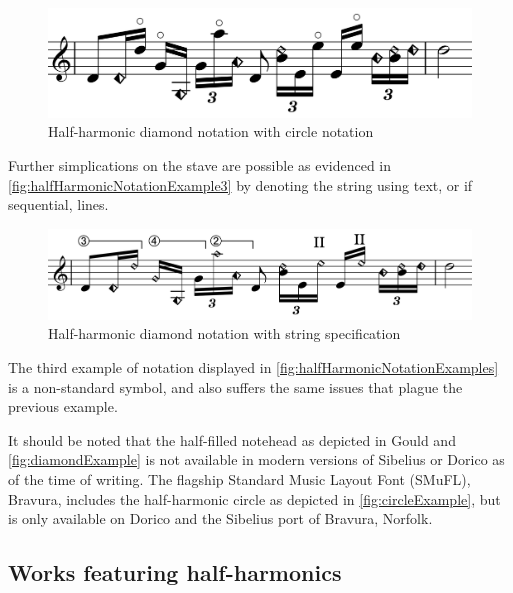   \begin{figure}
    \includegraphics[width=\linewidth]{./resources/diamondExample2.pdf}
    \caption{Half-harmonic diamond notation with circle notation} \label{fig:diamondExample2}
  \end{figure}

Further simplications on the stave are possible as evidenced in \autoref{fig:halfHarmonicNotationExample3} by denoting the string using text, or if sequential, lines.

\begin{figure}
    \includegraphics[width=\linewidth]{./resources/halfHarmonicNotationExample3.pdf}
    \caption{Half-harmonic diamond notation with string specification} \label{fig:halfHarmonicNotationExample3}
  \end{figure}

The third example of notation displayed in \autoref{fig:halfHarmonicNotationExamples} is a non-standard symbol, and also suffers the same issues that plague the previous example.

It should be noted that the half-filled notehead as depicted in Gould and \autoref{fig:diamondExample} is not available in modern versions of Sibelius or Dorico as of the time of writing.\autocite[424]{gouldBars2011}
The flagship Standard Music Layout Font (SMuFL), Bravura, includes the half-harmonic circle as depicted in \autoref{fig:circleExample}, but is only available on Dorico and the Sibelius port of Bravura, Norfolk.\autocite[]{w3ccommitteeStandardMusicFont2019}

\subsection{Works featuring half-harmonics} \label{sec:half-harmonicsLiterature}

